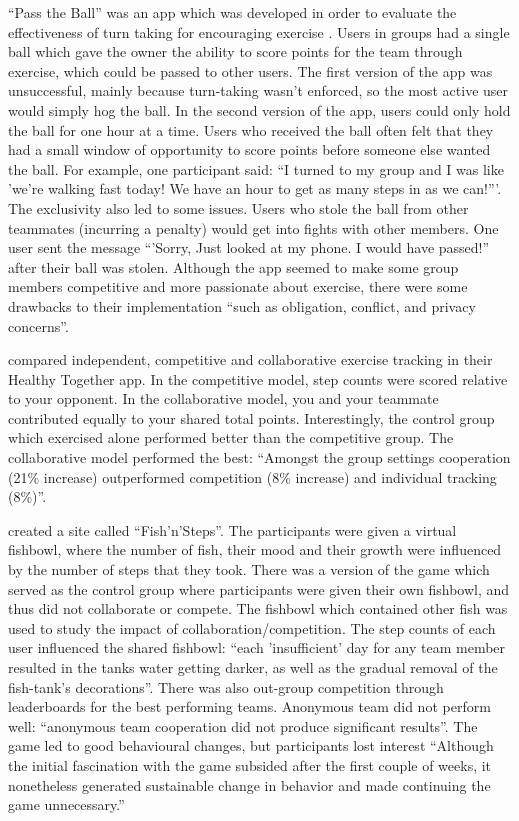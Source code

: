 \documentclass{l4proj}
\begin{document}
``Pass the Ball'' was an app which was developed in order to evaluate the effectiveness of turn taking for encouraging exercise \citep{Pass_the_ball}. Users in groups had a single ball which gave the owner the ability to score points for the team through exercise, which could be passed to other users. The first version of the app was unsuccessful, mainly because turn-taking wasn't enforced, so the most active user would simply hog the ball. In the second version of the app, users could only hold the ball for one hour at a time. Users who received the ball often felt that they had a small window of opportunity to score points before someone else wanted the ball. For example, one participant said: ``I turned to my group and I was like 'we’re walking fast today! We have an hour to get as many steps in as we can!'''. The exclusivity also led to some issues. Users who stole the ball from other teammates (incurring a penalty) would get into fights with other members. One user sent the message ``'Sorry, Just looked at my phone. I would have passed!'' after their ball was stolen. Although the app seemed to make some group members competitive and more passionate about exercise, there were some drawbacks to their implementation ``such as obligation, conflict, and privacy concerns''.

\citet{HealthyTogether} compared independent, competitive and collaborative exercise tracking in their Healthy Together app. In the competitive model, step counts were scored relative to your opponent. In the collaborative model, you and your teammate contributed equally to your shared total points. Interestingly, the control group which exercised alone performed better than the competitive group. The collaborative model performed the best: ``Amongst the group settings cooperation (21\% increase) outperformed competition (8\% increase) and individual tracking (8\%)''. 

\citet{Fish'n'Steps} created a site called ``Fish'n'Steps''. The participants were given a virtual fishbowl, where the number of fish, their mood and their growth were influenced by the number of steps that they took. There was a version of the game which served as the control group where participants were given their own fishbowl, and thus did not collaborate or compete. The fishbowl which contained other fish was used to study the impact of collaboration/competition. The step counts of each user influenced the shared fishbowl: ``each 'insufficient' day for any team member resulted in the tanks water getting darker, as well as the gradual removal of the fish-tank’s decorations''. There was also out-group competition through leaderboards for the best performing teams. Anonymous team did not perform well: ``anonymous team cooperation did not produce significant results''.  The game led to good behavioural changes, but participants lost interest ``Although the initial fascination with the game subsided after the first couple of weeks, it nonetheless generated sustainable change in behavior and made continuing the game unnecessary.''
\end{document}
